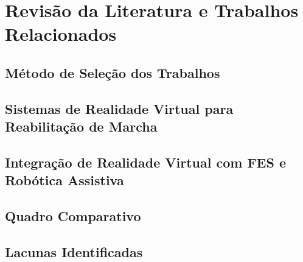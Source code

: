 \chapter{Revisão da Literatura e Trabalhos Relacionados}
\label{cap:revisao}

\section{Método de Seleção dos Trabalhos}

\section{Sistemas de Realidade Virtual para Reabilitação de Marcha}

\section{Integração de Realidade Virtual com FES e Robótica Assistiva}

\section{Quadro Comparativo}

\section{Lacunas Identificadas}
